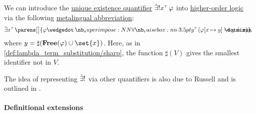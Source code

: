 \begin{remark}\label{rem:exists_unique_abbreviation}
  We can introduce the \hyperref[con:description_operator/exists_unique]{unique existence quantifier} \( \qExists {x^\tau} \varphi \) into \hyperref[def:higher_order_logic]{higher-order logic} via the following \hyperref[con:syntactic_abbreviation]{metalingual abbreviation}:
  \begin{equation}\label{eq:rem:exists_unique_abbreviation}
    \qexists {x^\tau} \parens[\big]{ \varphi \synwedge \qforall {y^\tau} (\varphi[x \mapsto y] \synimplies y \syneq x) },
  \end{equation}
  where \( y = \sharp(\op*{Free}(\varphi) \cup \set{ x }) \). Here, as in \cref{def:lambda_term_substitution/sharp}, the function \( \sharp(V) \) gives the smallest identifier not in \( V \).
\end{remark}
\begin{comments}
  \item The idea of representing \( \mathord{\dot{\exists} !} \) via other quantifiers is also due to Russell and is outlined in \cite{Russell1905OnDenoting}.
\end{comments}

\paragraph{Definitional extensions}

\begin{definition}\label{def:hol_definitional_extension}\mimprovised
\end{definition}
